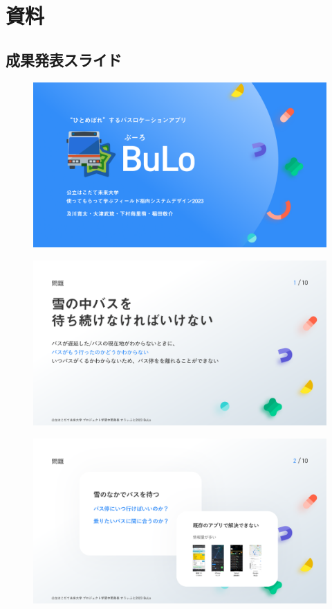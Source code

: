 \chapter{資料}
\section{成果発表スライド}
\begin{figure}[htbp]
    \centering
    \includegraphics[width=14cm]{images/slide0.png}
    \label{fig:slide0}
\end{figure}
\begin{figure}[htbp]
    \includegraphics[width=14cm]{images/slide1.png}
    \label{fig:slide1}
\end{figure}
\begin{figure}[htbp]
    \includegraphics[width=14cm]{images/slide2.png}
    \label{fig:slide2}
\end{figure}
